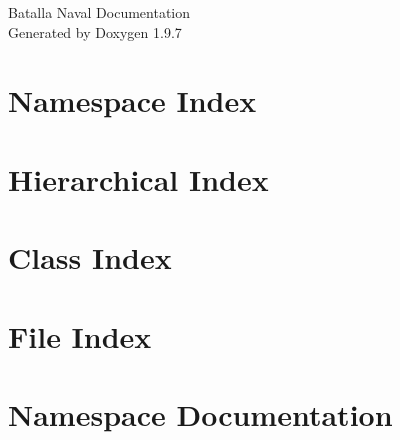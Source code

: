 \documentclass[twoside]{book}
\newcommand{\+}{\discretionary{\mbox{\scriptsize$\hookleftarrow$}}{}{}}
\newcommand{\clearemptydoublepage}{%
    \newpage{\pagestyle{empty}\cleardoublepage}%
  }
\begin{document}
  \raggedbottom
    \hypersetup{pageanchor=false,
                bookmarksnumbered=true,
                pdfencoding=unicode
               }
  \begin{titlepage}
  \vspace*{7cm}
  \begin{center}%
  {\Large Batalla Naval Documentation}\\
  \vspace*{1cm}
  {\large Generated by Doxygen 1.9.7}\\
  \end{center}
  \end{titlepage}
  \clearemptydoublepage
  \tableofcontents
  \clearemptydoublepage
  \hypersetup{pageanchor=true}

\chapter{Namespace Index}

\chapter{Hierarchical Index}

\chapter{Class Index}

\chapter{File Index}

\chapter{Namespace Documentation}






\end{document}
